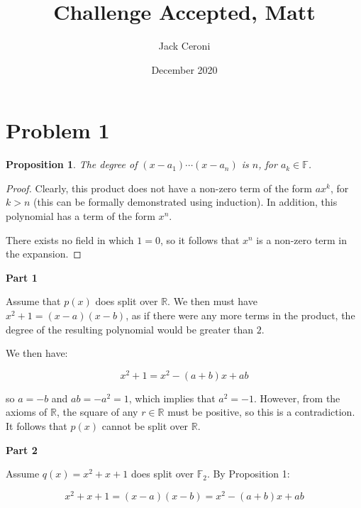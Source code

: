 \documentclass[10pt, oneside]{article}
\title{Challenge Accepted, Matt}
\author{Jack Ceroni}
\date{December 2020}
\newtheorem{prop}{Proposition}
\begin{document}
    \maketitle
    \tableofcontents

    \vspace{.25in}

    \newpage

    \section{Problem 1}

    \begin{prop}
      The degree of $(x - a_1) \cdots (x - a_n)$ is $n$, for $a_k \in \mathbb{F}$.
    \end{prop}

    \begin{proof}
      Clearly, this product does not have a non-zero term of the form $a x^{k}$, for $k > n$ (this can be formally demonstrated using induction).
      In addition, this
      polynomial has a term of the form $x^n$.
      \newline

      There exists no field in which $1 = 0$, so it follows that
      $x^n$ is a non-zero term in the expansion.
    \end{proof}

    \textbf{Part 1}
    \newline

    Assume that $p(x)$ does split over $\mathbb{R}$. We then must have $x^2 + 1 = (x - a)(x - b)$, as if there were any more terms
    in the product, the degree of the resulting polynomial would be greater than $2$.
    \newline

    We then have:

    $$x^2 + 1 = x^2 - (a + b)x + ab$$

    so $a = -b$ and $ab = -a^2 = 1$, which implies that $a^2 = -1$. However, from the axioms of $\mathbb{R}$, the square of any $r \in \mathbb{R}$ must be
    positive, so this is a contradiction. It follows that $p(x)$ cannot be split over $\mathbb{R}$.
    \newline

    \textbf{Part 2}
    \newline

    Assume $q(x) = x^2 + x + 1$ does split over $\mathbb{F}_2$. By Proposition 1:

    $$x^2 + x + 1 = (x - a)(x - b) = x^2 - (a + b)x + ab$$
\end{document}

